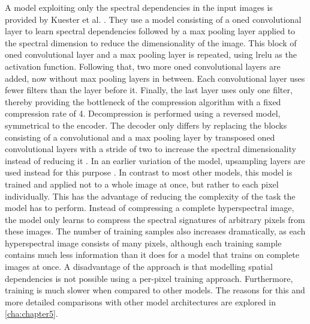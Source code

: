 A model exploiting only the spectral dependencies in the input images is provided by Kuester et al. \citep{kuester_1d-convolutional_2021,kuester_transferability_2022}. They use a model consisting of a \ac{oned} convolutional layer to learn spectral dependencies followed by a max pooling layer applied to the spectral dimension to reduce the dimensionality of the image. This block of \ac{oned} convolutional layer and a max pooling layer is repeated, using \ac{lrelu} as the activation function. Following that, two more \ac{oned} convolutional layers are added, now without max pooling layers in between. Each convolutional layer uses fewer filters than the layer before it. Finally, the last layer uses only one filter, thereby providing the bottleneck of the compression algorithm with a fixed compression rate of 4. Decompression is performed using a reversed model, symmetrical to the encoder. The decoder only differs by replacing the blocks consisting of a convolutional and a max pooling layer by transposed \ac{oned} convolutional layers with a stride of two to increase the spectral dimensionality instead of reducing it \citep{kuester_transferability_2022}. In an earlier variation of the model, upsampling layers are used instead for this purpose \citep{kuester_1d-convolutional_2021}. In contrast to most other models, this model is trained and applied not to a whole image at once, but rather to each pixel individually. This has the advantage of reducing the complexity of the task the model has to perform. Instead of compressing a complete hyperspectral image, the model only learns to compress the spectral signatures of arbitrary pixels from these images. The number of training samples also increases dramatically, as each hyperspectral image consists of many pixels, although each training sample contains much less information than it does for a model that trains on complete images at once. A disadvantage of the approach is that modelling spatial dependencies is not possible using a per-pixel training approach. Furthermore, training is much slower when compared to other models. The reasons for this and more detailed comparisons with other model architectures are explored in \autoref{cha:chapter5}.

